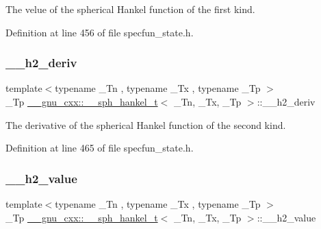 The velue of the spherical Hankel function of the first kind. 



Definition at line 456 of file specfun\+\_\+state.\+h.

\mbox{\label{struct____gnu__cxx_1_1____sph__hankel__t_a7b6cbd23f269cf3b0c76d1fc21bede4d}} 
\subsubsection{\texorpdfstring{\+\_\+\+\_\+h2\+\_\+deriv}{\_\_h2\_deriv}}
{\footnotesize\ttfamily template$<$typename \+\_\+\+Tn , typename \+\_\+\+Tx , typename \+\_\+\+Tp $>$ \\
\+\_\+\+Tp \hyperlink{struct____gnu__cxx_1_1____sph__hankel__t}{\+\_\+\+\_\+gnu\+\_\+cxx\+::\+\_\+\+\_\+sph\+\_\+hankel\+\_\+t}$<$ \+\_\+\+Tn, \+\_\+\+Tx, \+\_\+\+Tp $>$\+::\+\_\+\+\_\+h2\+\_\+deriv}



The derivative of the spherical Hankel function of the second kind. 



Definition at line 465 of file specfun\+\_\+state.\+h.

\mbox{\label{struct____gnu__cxx_1_1____sph__hankel__t_a225e48ba2faafbdabd65cd173372d418}} 
\subsubsection{\texorpdfstring{\+\_\+\+\_\+h2\+\_\+value}{\_\_h2\_value}}
{\footnotesize\ttfamily template$<$typename \+\_\+\+Tn , typename \+\_\+\+Tx , typename \+\_\+\+Tp $>$ \\
\+\_\+\+Tp \hyperlink{struct____gnu__cxx_1_1____sph__hankel__t}{\+\_\+\+\_\+gnu\+\_\+cxx\+::\+\_\+\+\_\+sph\+\_\+hankel\+\_\+t}$<$ \+\_\+\+Tn, \+\_\+\+Tx, \+\_\+\+Tp $>$\+::\+\_\+\+\_\+h2\+\_\+value}



